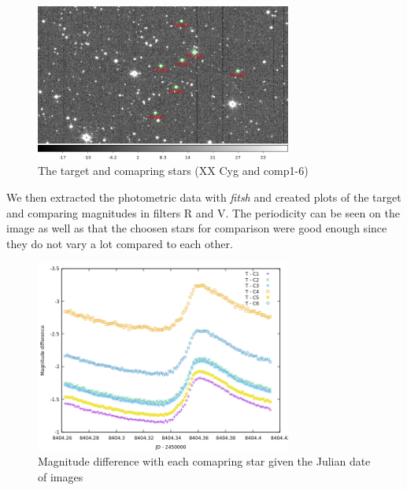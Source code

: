 \documentclass[a4paper,12pt]{article}
\begin{document}
\begin{figure}[H]
    \centering
    \includegraphics[width=0.75\textwidth]{../PSCH-20181012/psch/20181012/withStars.png}
    \caption{The target and comapring stars (XX Cyg and comp1-6)}
\end{figure}

\par We then extracted the photometric data with \textit{fitsh} and created plots
of the target and comparing magnitudes in filters R and V. The periodicity can be seen
on the image as well as that the choosen stars for comparison were good enough since 
they do not vary a lot compared to each other.

\begin{figure}[H]
    \centering
    \includegraphics[width=0.75\textwidth]{../PSCH-20181012/psch/20181012/mag-jd.png}
    \caption{Magnitude difference with each comapring star given the Julian date of images}
    \label{fig:jd}
\end{figure}
\end{document}
